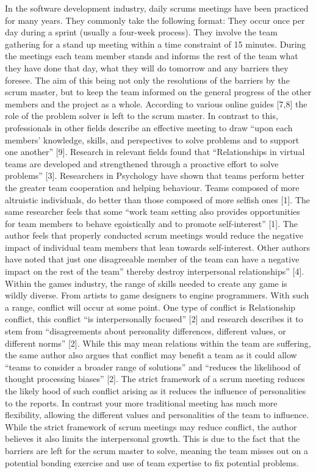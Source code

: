 \documentclass{scrartcl}
\begin{document}
In the software development industry, daily scrums meetings have been practiced for many years. They commonly take the following format:
 They occur once per day during a sprint (usually a four-week process). 
They involve the team gathering for a stand up meeting within a time constraint of 15 minutes. 
During the meetings each team member stands and informs the rest of the team what they have done that day, what they will do tomorrow and any barriers they foresee.
The aim of this being not only the resolutions of the barriers by the scrum master, but to keep the team informed on the general progress of the other members and the project as a whole. 
 According to various online guides [7,8] the role of the problem solver is left to the scrum master. In contrast to this, professionals in other fields describe an effective meeting to draw “upon each members' knowledge, skills, and perspectives to solve problems and to support one another” [9]. Research in relevant fields found that “Relationships in virtual teams are developed and strengthened through a proactive effort to solve problems” [3]. 
Researchers in Psychology have shown that teams perform better the greater team cooperation and helping behaviour. Teams composed of more altruistic individuals, do better than those composed of more selfish ones [1].  The same researcher feels that some “work team setting also provides opportunities for team members to behave egoistically and to promote self-interest” [1]. The author feels that properly conducted scrum meetings would reduce the negative impact of individual team members that lean towards self-interest. Other authors have noted that just one disagreeable member of the team can have a negative impact on the rest of the team” thereby destroy interpersonal relationships” [4].
Within the games industry, the range of skills needed to create any game is wildly diverse. From artists to game designers to engine programmers. With such a range, conflict will occur at some point. One type of conflict is Relationship conflict, this conflict “is interpersonally focused” [2] and research describes it to stem from “disagreements about personality differences, different values, or different norms” [2]. While this may mean relations within the team are suffering, the same author also argues that conflict may benefit a team as it could allow “teams to consider a broader range of solutions” and “reduces the likelihood of thought processing biases” [2]. The strict framework of a scrum meeting reduces the likely hood of such conflict arising as it reduces the influence of personalities to the reports. In contrast your more traditional meeting has much more flexibility, allowing the different values and personalities of the team to influence. While the strict framework of scrum meetings may reduce conflict, the author believes it also limits the interpersonal growth. This is due to the fact that the barriers are left for the scrum master to solve, meaning the team misses out on a potential bonding exercise and use of team expertise to fix potential problems.
\end{document}
